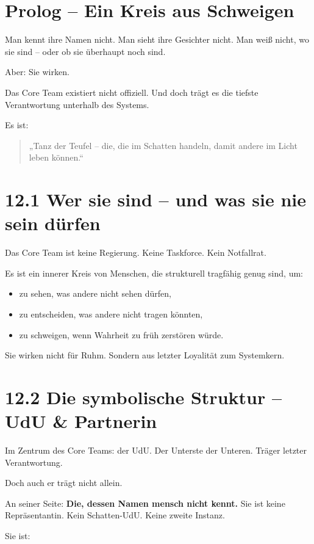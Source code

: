 \documentclass[12pt,a4paper]{book}
\begin{document}
\section*{Prolog – Ein Kreis aus Schweigen}

Man kennt ihre Namen nicht.  
Man sieht ihre Gesichter nicht.  
Man weiß nicht, wo sie sind – oder ob sie überhaupt noch sind.

Aber: Sie wirken.

Das Core Team existiert nicht offiziell.  
Und doch trägt es die tiefste Verantwortung unterhalb des Systems.

Es ist:  
\begin{quote}
„Tanz der Teufel –  
die, die im Schatten handeln, damit andere im Licht leben können.“  
\end{quote}

\section*{12.1 Wer sie sind – und was sie nie sein dürfen}

Das Core Team ist keine Regierung.  
Keine Taskforce. Kein Notfallrat.

Es ist ein innerer Kreis von Menschen,  
die strukturell tragfähig genug sind, um:

\begin{itemize}
    \item zu sehen, was andere nicht sehen dürfen,
    \item zu entscheiden, was andere nicht tragen könnten,
    \item zu schweigen, wenn Wahrheit zu früh zerstören würde.
\end{itemize}

Sie wirken nicht für Ruhm.  
Sondern aus letzter Loyalität zum Systemkern.

\section*{12.2 Die symbolische Struktur – UdU \& Partnerin}

Im Zentrum des Core Teams: der UdU.  
Der Unterste der Unteren. Träger letzter Verantwortung.

Doch auch er trägt nicht allein.

An seiner Seite:  
\textbf{Die, dessen Namen mensch nicht kennt.}  
Sie ist keine Repräsentantin. Kein Schatten-UdU. Keine zweite Instanz.

Sie ist:
\end{document}
